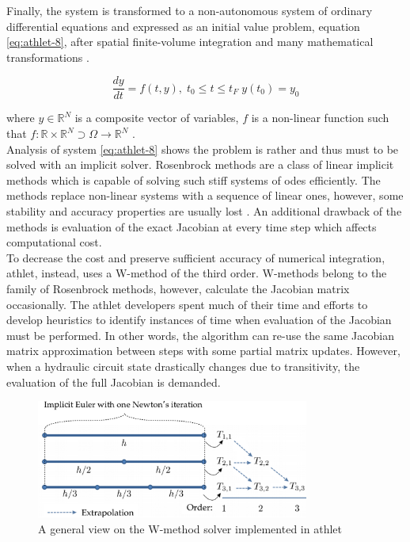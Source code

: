 Finally, the system is transformed to a non-autonomous system of ordinary differential equations and expressed as an initial value problem, equation \ref{eq:athlet-8}, after spatial finite-volume integration and many mathematical transformations \cite{lt:ATHLMaM}. 


\begin{equation} \label{eq:athlet-8}
	\frac{dy}{dt} = f(t,y), \;  t_{0} \leq t \leq t_{F} \; y(t_{0}) = y_{0}
\end{equation}

where $y \in \mathbb{R}^{N}$ is a composite vector of variables, $f$ is a non-linear function such that $f : \mathbb{R} \times \mathbb{R}^{N} \supset \Omega  \rightarrow \mathbb{R}^{N}$  .\\


Analysis of system \ref{eq:athlet-8} shows the problem is rather and thus must to be solved with an implicit solver. Rosenbrock methods are a class of linear implicit methods which is capable of solving such stiff systems of \gls{ode}s efficiently. The methods replace non-linear systems with a sequence of linear ones, however, some stability and accuracy properties are usually lost \cite{blom2013rosenbrock}. An additional drawback of the methods is evaluation of the exact Jacobian at every time step which affects computational cost.\\


To decrease the cost and preserve sufficient accuracy of numerical integration, \gls{athlet}, instead, uses a W-method of the third order. W-methods belong to the family of Rosenbrock methods, however, calculate the Jacobian matrix occasionally. The \gls{athlet} developers spent much of their time and efforts to develop heuristics to identify instances of time when evaluation of the Jacobian must be performed. In other words, the algorithm can re-use the same Jacobian matrix approximation between steps with some partial matrix updates. However, when a hydraulic circuit state drastically changes due to transitivity, the evaluation of the full Jacobian is demanded.\\


\figpointer{\ref{fig:introduction-w-method-scheme}}
\begin{figure}[htpb]
  \centering
  \includegraphics[width=0.8\textwidth]{figures/introduction-rosenbrock-scheme.png}
\caption{A general view on the W-method solver implemented in \gls{athlet}}
\label{fig:introduction-w-method-scheme}
\end{figure}


